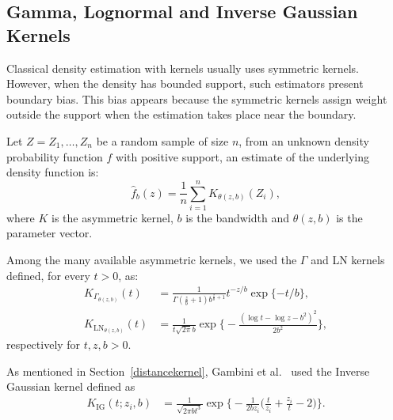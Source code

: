 \documentclass[twocolumn]{svjour3}
\begin{document}
\subsection{Gamma, Lognormal and Inverse Gaussian Kernels}
\label{asymmetrickernel}

Classical density estimation with kernels usually uses symmetric kernels. 
However, when the density has bounded support, such estimators present boundary bias. 
This bias appears because the symmetric kernels assign weight outside the support when the estimation takes place near the boundary.


Let $ Z = Z_1,\dots, Z_n$ be a random sample of size $n$, from an unknown density probability function $f$ with positive support, an estimate of the underlying density function is:
$$
\widehat{f}_b(z)=\frac{1}{n}\sum_{i=1}^n K_{\theta(z,b)}(Z_i),
$$ 
where $K$ is the asymmetric kernel, $b$ is the bandwidth and ${\theta}(z,b)$ is the parameter vector.

Among the many available asymmetric kernels, we used the $\Gamma$ and LN kernels defined, for every $t>0$, as:
\begin{align}
K_{{\Gamma}_{{\theta}(z,b)}}(t) & =\frac{1}{\Gamma(\frac{z}{b}+1)b^{\frac{z}{b}+1}} t^{-{z}/{b}} \exp\{-{t}/{b}\},
\label{gammakernel}\\
K_{{\text{{LN}}}_{{\theta}(z,b)}}(t) & =\frac{1}{t \sqrt{2 \pi} b} \exp\Big\{-\frac{\left(\log t - \log z -b^2\right)^2}{2b^2}\Big\},
\label{LNkernel}
\end{align}
respectively for $t,z,b>0$.

As mentioned in Section~\ref{distancekernel}, Gambini et al.~\cite{gambini2015} used the Inverse Gaussian kernel defined as
\begin{align}
K_{\text{IG}}( t; z_i,b) & =\frac{1}{\sqrt{2\pi b t^3}} 
\exp\Big\{-\frac{1}{2b z_i} \Big(\frac{t}{z_i}+\frac{z_i}{t}-2\Big)\Big\}.
\end{align}
\end{document}
